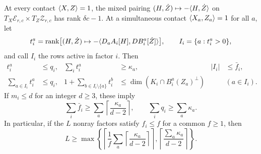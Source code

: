 \begin{proposition}\label{prop:spectral-contact}
At every contact $\langle X,Z\rangle=1$, the mixed pairing
$(H,\dot Z)\mapsto-\langle H,\dot Z\rangle$ on
$T_X\mathcal E_{r,c}\times T_Z\mathcal Z_{r,c}$ has rank
$\delta c-1$.  At a simultaneous contact
$\langle X_a,Z_a\rangle=1$ for all $a$, let
\[
 t_i^a=\operatorname{rank}\bigl[(H,\dot Z)\mapsto
       -\langle D_aA_i[H],DB_i^a[\dot Z]\rangle\bigr],
 \qquad I_i=\{a:t_i^a>0\},
\]
and call $I_i$ the rows active in factor $i$.  Then
\begin{align}
 t_i^a&\leq q_i,& \sum_i t_i^a&\geq\kappa_a,
       & |I_i|&\leq\bar f_i,\label{eq:spectral-channel-budgets}\\
 \sum_{a\in I_i}t_i^a&\leq q_i,&
 1+\sum_{b\in I_i\setminus\{a\}}t_i^b
   &\leq\dim(K_i\cap B_i^a(Z_a)^\perp)
       &&(a\in I_i).\label{eq:spectral-face-budget}
\end{align}
If $m_i\leq d$ for an integer $d\geq3$, these imply
\begin{equation}\label{eq:spectral-summed-budgets}
 \sum_i\bar f_i\geq
       \sum_a\left\lceil\frac{\kappa_a}{d-2}\right\rceil,
 \qquad
 \sum_iq_i\geq\sum_a\kappa_a.
\end{equation}
In particular, if the $L$ nonray factors satisfy
$f_i\leq f$ for a common $f\geq1$, then
\[
 L\geq\max\left\{
       \left\lceil\frac1f\sum_a
          \left\lceil\frac{\kappa_a}{d-2}\right\rceil\right\rceil,
       \left\lceil\frac{\sum_a\kappa_a}{d-2}\right\rceil
       \right\}.
\]
\end{proposition}
